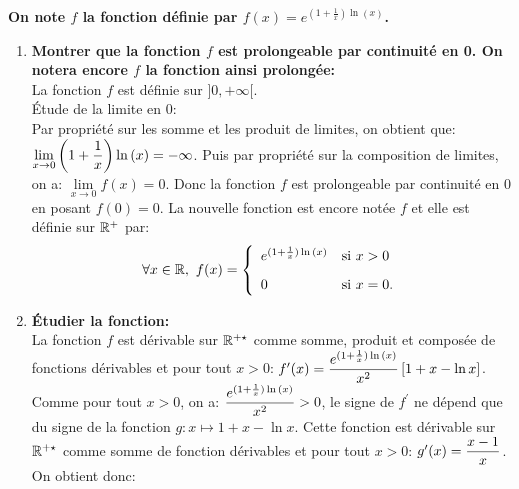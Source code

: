 \documentclass[a4paper, 11pt,reqno]{article}
\begin{document}
\begin{correction}  \;
	\noindent \textbf{On note $f$ la fonction d\'efinie par $f(x)=e^{(1+\frac{1}{x})\ln{(x)}}$. }
	\begin{enumerate}
		\item \textbf{Montrer que la fonction $f$ est prolongeable par continuit\'e en 0. On notera encore $f$ la fonction ainsi prolong\'ee:}\\
		      \noindent La fonction $f$ est d\'efinie sur $\rbrack 0,+\infty\lbrack$.\\
		      \noindent \'Etude de la limite en $0$:\\
		      \noindent Par propri\'et\'e sur les somme et les produit de limites, on obtient que: $\lim\limits_{x\to 0} \left(  1+\displaystyle\frac{1}{x} \right)\ln{(x)}=-\infty$. Puis par propri\'et\'e sur la composition de limites, on a: $\lim\limits_{x\to 0} f(x)=0$. Donc la fonction $f$ est prolongeable par continuit\'e en 0 en posant $f(0)=0$. La nouvelle fonction est encore not\'ee $f$ et elle est d\'efinie sur $\mathbb{R}^+$ par:
		      $$\forall x\in\R,\ f(x)=\left\lbrace \begin{array}{ll}
				      e^{(1+\frac{1}{x})\ln{(x)}} & \hbox{si}\ x> 0\vsec \\
				      0                           & \hbox{si}\ x=0.
			      \end{array}\right.
		      $$
		\item \textbf{\'Etudier la fonction:}\\
		      \noindent La fonction $f$ est d\'erivable sur $\mathbb{R}^{+\star}$ comme somme, produit et compos\'ee de fonctions d\'erivables et pour tout $x>0$: $f^{\prime}(x)=\displaystyle\frac{e^{(1+\frac{1}{x})\ln{(x)}}}{x^2} \left\lbrack 1+x-\ln{x}   \right\rbrack$. Comme pour tout $x>0$, on a: $
			      \displaystyle\frac{e^{(1+\frac{1}{x})\ln{(x)}}}{x^2} >0$, le signe de $f^{\prime}$ ne d\'epend que du signe de la fonction $g: x\mapsto 1+x-\ln{x} $. Cette fonction est d\'erivable sur $\mathbb{R}^{+\star}$ comme somme de fonction d\'erivables et pour tout $x>0$: $g^{\prime}(x)=\displaystyle\frac{x-1}{x}$. On obtient donc:
		      \begin{center}

\end{center}
\end{enumerate}
\end{correction}
\end{document}
